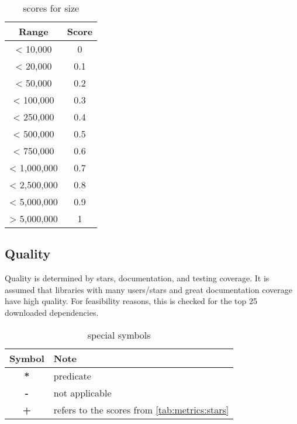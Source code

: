 \begin{table}[H]
    \centering
    \begin{tabular}{|c|c|}
        \hline
        \textbf{Range} & \textbf{Score} \\
        \hline
        < 10,000       & 0              \\ \hline
        < 20,000       & 0.1            \\ \hline
        < 50,000       & 0.2            \\ \hline
        < 100,000      & 0.3            \\ \hline
        < 250,000      & 0.4            \\ \hline
        < 500,000      & 0.5            \\ \hline
        < 750,000      & 0.6            \\ \hline
        < 1,000,000    & 0.7            \\ \hline
        < 2,500,000    & 0.8            \\ \hline
        < 5,000,000    & 0.9            \\ \hline
        > 5,000,000    & 1              \\ \hline
    \end{tabular}
    \caption{scores for size }
    \label{tab:metrics:size}
\end{table}


\subsection{Quality}
\label{app:metrics:ecosystem:quality}

Quality is determined by stars, documentation, and testing coverage. It is assumed that libraries with many users/stars and great documentation coverage have high quality. For feasibility reasons, this is checked for the top 25 downloaded dependencies.

\begin{table}[H]
    \centering
    \begin{tabular}{|c|l|}
        \hline
        \textbf{Symbol} & \textbf{Note}                                         \\
        \hline
        \textbf{*}      & \gls{predicate}                                       \\ \hline
        \textbf{-}      & not applicable                                        \\ \hline
        \textbf{+}      & refers to the scores from \autoref{tab:metrics:stars} \\ \hline
    \end{tabular}
    \caption{special symbols}
    \label{tab:metrics:symbols}
\end{table}


